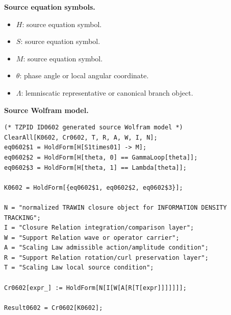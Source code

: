 \begin{minipage}[t]{0.49\linewidth}
\begingroup
\small
\raggedright
\textbf{Source equation symbols.}\par
\begin{itemize}[leftmargin=1.35em,itemsep=1pt,topsep=1pt,parsep=0pt]
    \item $H$: source equation symbol.
    \item $S$: source equation symbol.
    \item $M$: source equation symbol.
    \item $\theta$: phase angle or local angular coordinate.
    \item $\Lambda$: lemniscatic representative or canonical branch object.
\end{itemize}
\endgroup
\end{minipage}\hfill
\begin{minipage}[t]{0.47\linewidth}
\begingroup
\scriptsize
\raggedright
\textbf{Source Wolfram model.}\par
\begin{Verbatim}[fontsize=\tiny,breaklines=true,breakanywhere=true]
(* TZPID ID0602 generated source Wolfram model *)
ClearAll[K0602, Cr0602, T, R, A, W, I, N];
eq0602$1 = HoldForm[H[S1times01] -> M];
eq0602$2 = HoldForm[H[theta, 0] == GammaLoop[theta]];
eq0602$3 = HoldForm[H[theta, 1] == Lambda[theta]];

K0602 = HoldForm[{eq0602$1, eq0602$2, eq0602$3}];

N = "normalized TRAWIN closure object for INFORMATION DENSITY TRACKING";
I = "Closure Relation integration/comparison layer";
W = "Support Relation wave or operator carrier";
A = "Scaling Law admissible action/amplitude condition";
R = "Support Relation rotation/curl preservation layer";
T = "Scaling Law local source condition";

Cr0602[expr_] := HoldForm[N[I[W[A[R[T[expr]]]]]]];

Result0602 = Cr0602[K0602];
\end{Verbatim}
\endgroup
\end{minipage}

